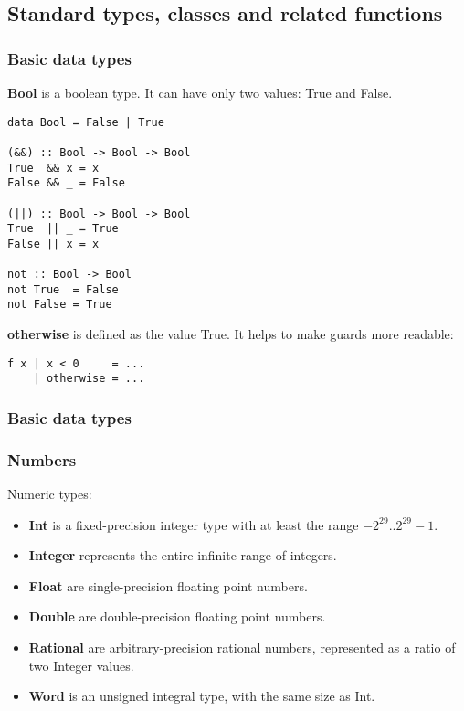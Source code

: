 %

\subsection{Standard types, classes and related functions}

\subsubsection{Basic data types}
\textbf{Bool} is a boolean type. It can have only two values: True and False.
\begin{verbatim}
data Bool = False | True

(&&) :: Bool -> Bool -> Bool
True  && x = x
False && _ = False

(||) :: Bool -> Bool -> Bool
True  || _ = True
False || x = x

not :: Bool -> Bool
not True  = False
not False = True
\end{verbatim}

\textbf{otherwise} is defined as the value True. It helps to make guards more readable:
\begin{verbatim}
f x | x < 0     = ...
    | otherwise = ...
\end{verbatim}

\subsubsection{Basic data types}

\subsubsection{Numbers}
Numeric types:
\begin{itemize}
\item \textbf{Int} is a fixed-precision integer type with at least the range $-2^{29} .. 2^{29}-1$.
\item \textbf{Integer} represents the entire infinite range of integers.
\item \textbf{Float} are single-precision floating point numbers.
\item \textbf{Double} are double-precision floating point numbers.
\item \textbf{Rational} are arbitrary-precision rational numbers, represented as a ratio of two Integer values.
\item \textbf{Word} is an unsigned integral type, with the same size as Int.
\end{itemize}

